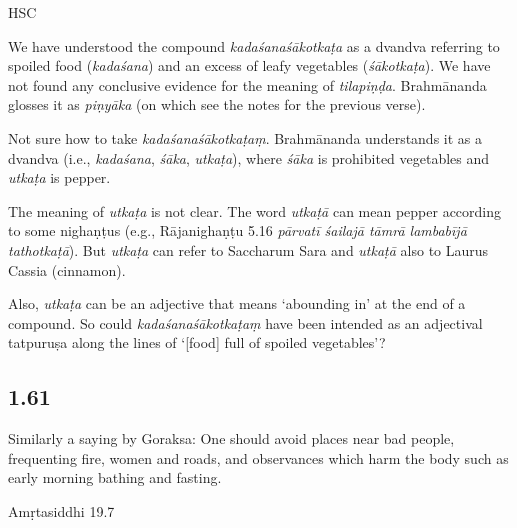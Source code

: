 \begin{ekdosis}
\begin{testimonia}[hp01_060]
HSC

\begin{versinnote}
\end{versinnote}

\end{testimonia}

\begin{philcomm}[hp01_060]
We have understood the compound \emph{kadaśanaśākotkaṭa} as a dvandva referring to spoiled food (\emph{kadaśana}) and an excess of leafy vegetables (\emph{śākotkaṭa}).
We have not found any conclusive evidence for the meaning of \emph{tilapiṇḍa}. Brahmānanda glosses it as \emph{piṇyāka} (on which see the notes for the previous verse).

Not sure how to take \emph{kadaśanaśākotkaṭaṃ}. Brahmānanda understands it as a dvandva (i.e., \emph{kadaśana}, \emph{śāka}, \emph{utkaṭa}), where \emph{śāka} is prohibited vegetables and \emph{utkaṭa} is pepper.

The meaning of \emph{utkaṭa} is not clear. The word \emph{utkaṭā} can mean pepper according to some nighaṇṭus (e.g., Rājanighaṇṭu 5.16 \emph{pārvatī śailajā tāmrā lambabījā tathotkaṭā}). But \emph{utkaṭa} can refer to Saccharum Sara and \emph{utkaṭā} also to Laurus Cassia (cinnamon).

Also, \emph{utkaṭa} can be an adjective that means ‘abounding in’ at the end of a compound. So could \emph{kadaśanaśākotkaṭaṃ} have been intended as an adjectival tatpuruṣa along the lines of ‘[food] full of spoiled vegetables’?
\end{philcomm}

\subsection*{1.61}
\begin{translation}[hp01_061]
Similarly a saying by Goraksa:
One should avoid places near bad people, frequenting fire, women and roads, and observances which harm the body such as early morning bathing and fasting.
\end{translation}

\begin{sources}[hp01_061]
Amṛtasiddhi 19.7

\begin{versinnote}
\end{versinnote}


\end{sources}
\end{ekdosis}
